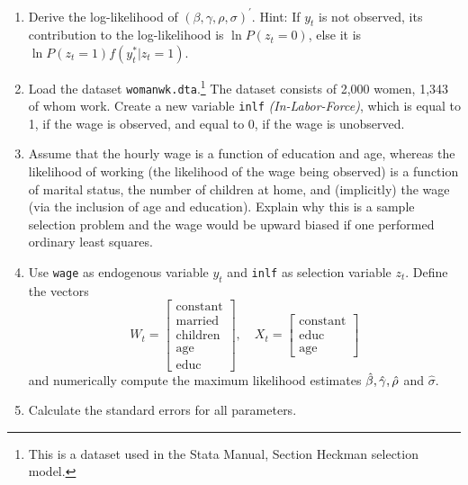 \documentclass{article}
\begin{document}
\begin{enumerate}
\item Derive the log-likelihood of $\left( \beta ,\gamma ,\rho ,\sigma
\right) ^{\prime }$. Hint: If $y_{t}$ is not observed, its contribution to
the log-likelihood is $\ln P\left( z_{t}=0\right) $, else it is $\ln P\left(
z_{t}=1\right) f\left( y_{t}^{\ast }|z_{t}=1\right) $.

\item Load the dataset \texttt{womanwk.dta}.\footnote{This is a dataset used in the Stata Manual, Section Heckman selection model.} The dataset consists of 2,000 women, 1,343 of whom work. Create a new variable \texttt{inlf} \emph{(In-Labor-Force)}, which is equal to 1, if the wage is observed, and equal to 0, if the wage is unobserved.
\item Assume that the hourly wage is a function of education and age, whereas the likelihood of working (the likelihood of the wage being observed) is a function of marital status, the number of children at home, and (implicitly) the wage (via the inclusion of age and education). Explain why this is a sample selection problem and the wage would be upward biased if one performed ordinary least squares.
\item Use \texttt{wage} as endogenous variable $y_{t}$ and \texttt{inlf} as selection variable $z_{t}$. Define the vectors
\begin{equation*}
W_{t}=\left[
\begin{array}{c}
\text{constant}\\
\text{married} \\
\text{children} \\
\text{age} \\
\text{educ}%
\end{array}%
\right] ,\quad X_{t}=\left[
\begin{array}{c}
\text{constant}\\
\text{educ}\\
\text{age}
\end{array}%
\right]
\end{equation*}%
and numerically compute the maximum likelihood estimates $\hat{\beta},\hat{%
\gamma},\hat{\rho}$ and $\hat{\sigma}$.
\item Calculate the standard errors for all parameters.
\end{enumerate}
\end{document}
